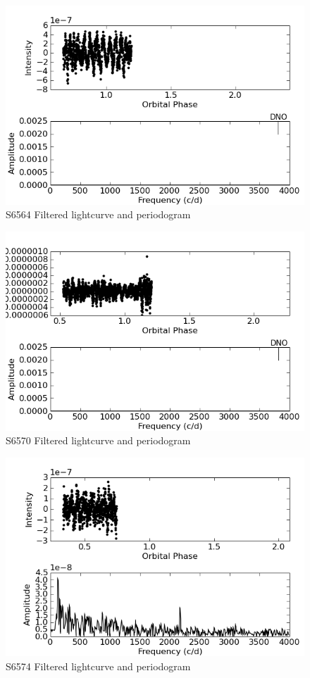\begin{figure}
 \centering
 \includegraphics[bb=0 0 600 400,width=0.85\columnwidth]{images/archive_phot/S6564/S6564d_FF.png}
 \caption{S6564 Filtered lightcurve and periodogram}
 \label{S6564_c_FF}
\end{figure}

\begin{figure}
 \centering
 \includegraphics[bb=0 0 600 400,width=0.85\columnwidth]{images/archive_phot/S6570/S6570d_FF.png}
 \caption{S6570 Filtered lightcurve and periodogram}
 \label{S6570_c_FF}
\end{figure}

\begin{figure}
 \centering
 \includegraphics[bb=0 0 600 400,width=0.85\columnwidth]{images/archive_phot/S6574/S6574d_FF.png}
 \caption{S6574 Filtered lightcurve and periodogram}
 \label{S6574_c_FF}
\end{figure}

